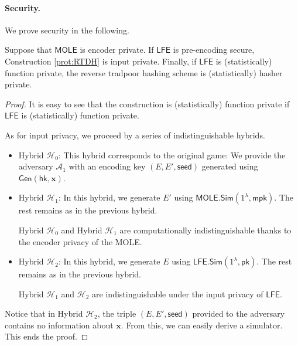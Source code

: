 \documentclass{theoretics}
\newcommand{\LFE}{\mathsf{LFE}}
\newcommand{\MOLE}{\mathsf{MOLE}}
\renewcommand{\sec}{\ensuremath{\lambda}}
\newcommand{\Sim}{\mathsf{Sim}}
\newcommand{\Adv}{\mathcal{A}}
\newcommand{\algofont}[1]{\ensuremath{\mathsf{#1}}}
\newcommand{\Gen}{{\algofont{Gen}}}
\newcommand{\mpk}{\mathsf{mpk}}
\newcommand{\pk}{{\mathsf{pk}}}
\newcommand{\hk}{\ensuremath{\mathsf{hk}}}
\newcommand\bbbone{1}
\begin{document}
\paragraph{Security.} We prove security in the following.
\begin{theorem}
    Suppose that $\MOLE$ is encoder private. If $\LFE$ is pre-encoding secure, Construction \ref{prot:RTDH} is input private. 
    Finally, if $\LFE$ is (statistically) function private, the reverse tradpoor hashing scheme is (statistically) hasher private.
\end{theorem}
\begin{proof}
It is easy to see that the construction is (statistically) function private if $\LFE$ is (statistically) function private.

As for input privacy, we proceed by a series of indistinguishable hybrids.

\begin{itemize}
\item Hybrid $\mathcal{H}_0$: This hybrid corresponds to the original game: We provide the adversary $\Adv_1$ with an encoding key $(E, E', \mathsf{seed})$ generated using $\Gen(\hk, \mathbf{x})$. 

\item Hybrid ${\mathcal{H}_1}$: In this hybrid, we generate $E'$ using $\MOLE.\Sim(\bbbone^\sec, \mpk)$. The rest remains as in the previous hybrid.

Hybrid ${\mathcal{H}_0}$ and Hybrid ${\mathcal{H}_1}$ are computationally indistinguishable thanks to the encoder privacy of the MOLE.

\item Hybrid ${\mathcal{H}_2}$: In this hybrid, we generate $E$ using $\LFE.\Sim(\bbbone^\sec, \pk)$. 
The rest remains as in the previous hybrid.

Hybrid ${\mathcal{H}_1}$ and ${\mathcal{H}_2}$ are indistinguishable under the input privacy of $\LFE$.
\end{itemize}
Notice that in Hybrid ${\mathcal{H}_2}$, the triple $(E, E', \mathsf{seed})$ provided to the adversary contains no information about $\mathbf{x}$. From this, we can easily derive a simulator. This ends the proof.
\end{proof}
\end{document}
